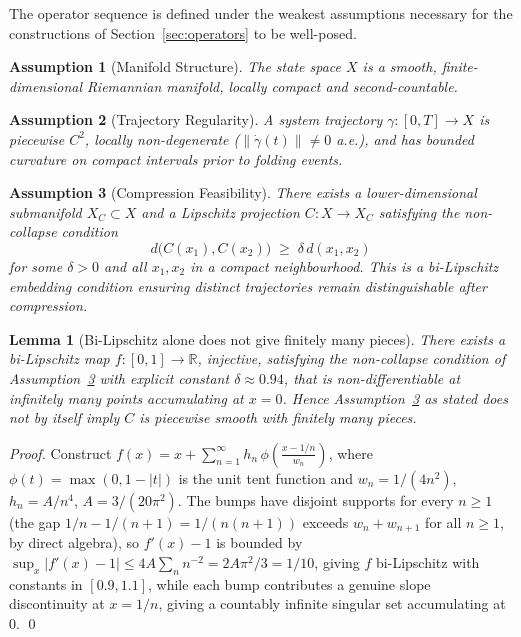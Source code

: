 \documentclass[14pt,a4paper]{extarticle}
\newtheorem{lemma}[theorem]{Lemma}
\newtheorem{assumption}{Assumption}[section]
\begin{document}
The operator sequence is defined under the weakest assumptions
necessary for the constructions of Section~\ref{sec:operators} to
be well-posed.

\begin{assumption}[Manifold Structure]
\label{ass:manifold}
The state space $X$ is a smooth, finite-dimensional Riemannian
manifold, locally compact and second-countable.
\end{assumption}

\begin{assumption}[Trajectory Regularity]
\label{ass:trajectory}
A system trajectory $\gamma : [0,T] \to X$ is piecewise $C^2$,
locally non-degenerate ($\|\dot\gamma(t)\| \neq 0$ a.e.), and has
bounded curvature on compact intervals prior to folding events.
\end{assumption}

\begin{assumption}[Compression Feasibility]
\label{ass:compression}
There exists a lower-dimensional submanifold $X_C \subset X$ and a
Lipschitz projection $C : X \to X_C$ satisfying the non-collapse
condition
\[
  d\bigl(C(x_1), C(x_2)\bigr) \;\geq\; \delta\, d(x_1, x_2)
\]
for some $\delta > 0$ and all $x_1, x_2$ in a compact neighbourhood.
This is a bi-Lipschitz embedding condition ensuring distinct
trajectories remain distinguishable after compression.
\end{assumption}

\begin{lemma}[Bi-Lipschitz alone does not give finitely many pieces]
\label{lem:noncomp-counterexample}
There exists a bi-Lipschitz map $f:[0,1]\to\mathbb{R}$, injective,
satisfying the non-collapse condition of Assumption~\ref{ass:compression}
with explicit constant $\delta\approx0.94$, that is non-differentiable at
infinitely many points accumulating at $x=0$. Hence
Assumption~\ref{ass:compression} as stated does not by itself imply $C$ is
piecewise smooth with finitely many pieces.
\end{lemma}

\begin{proof}
Construct $f(x) = x + \sum_{n=1}^{\infty} h_n\,\phi\!\left(\frac{x -
1/n}{w_n}\right)$, where $\phi(t) = \max(0, 1-|t|)$ is the unit tent function
and $w_n = 1/(4n^2)$, $h_n = A/n^4$, $A = 3/(20\pi^2)$. The bumps have
disjoint supports for every $n\geq1$ (the gap $1/n - 1/(n+1) =
1/(n(n{+}1))$ exceeds $w_n+w_{n+1}$ for all $n\geq1$, by direct algebra),
so $f'(x)-1$ is bounded by $\sup_x|f'(x)-1| \leq 4A\sum_n n^{-2} =
2A\pi^2/3 = 1/10$, giving $f$ bi-Lipschitz with constants in $[0.9,1.1]$,
while each bump contributes a genuine slope discontinuity at $x=1/n$,
giving a countably infinite singular set accumulating at $0$.
\qed
\end{proof}
\end{document}

